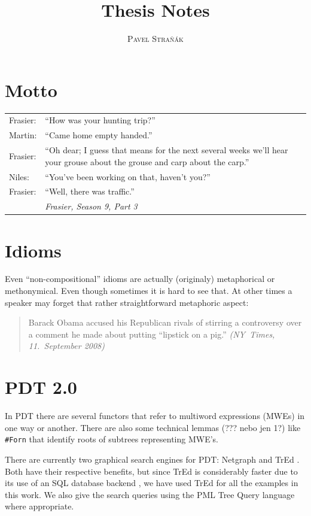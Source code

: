 \documentclass[11pt, a4paper]{article}
\title{Thesis Notes}
\author{\textsc{Pavel Straňák}}
\begin{document}
\maketitle

\section*{Motto}
\begin{tabular}{@{} lp{11cm} @{}} %
Frasier: & ``How was your hunting trip?''\\
Martin: & ``Came home empty handed.''\\
Frasier: & ``Oh dear; I guess that means for the next several weeks we'll hear your grouse about the grouse and carp about the carp.''\\
Niles: & ``You've been working on that, haven't you?''\\
Frasier: & ``Well, there was traffic.''\\
 & \raggedleft\emph{Frasier, Season 9, Part 3}\\
\end{tabular}

\section*{Idioms}
Even ``non-compositional'' idioms are actually (originaly) metaphorical or methonymical.  Even though sometimes it is hard to see that. At other times a speaker may forget that rather straightforward metaphoric aspect:

\begin{quote}
Barack Obama accused his Republican rivals of stirring a controversy over a comment he made about putting “lipstick on a pig.” \emph{(NY~Times, 11.~September 2008)}
\end{quote}


\section{PDT 2.0}\label{PDT}
In PDT there are several functors that refer to multiword expressions (MWEs) in one way or another. There are also some technical lemmas (??? nebo jen 1?) like {\tt \#Forn} that identify roots of subtrees representing MWE's.

There are currently two graphical search engines for PDT: Netgraph \cite{netgraph} and TrEd \cite{tred}. Both have their respective benefits, but since TrEd is considerably faster due to its use of an SQL database backend \cite{pmltq}, we have used TrEd for all the examples in this work. We also give the search queries using the PML Tree Query language \cite{pmltq} where appropriate.
\end{document}
